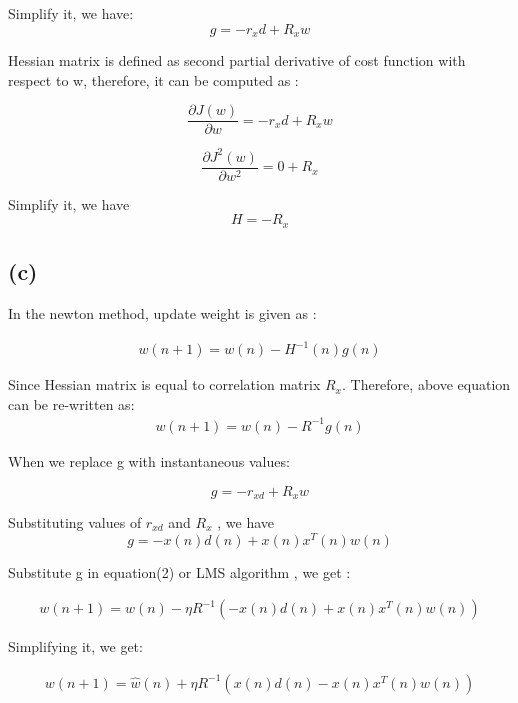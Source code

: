 \documentclass[12pt]{article}
\begin{document}
Simplify it, we have: $$ g = -r_xd + R_xw $$ 

Hessian matrix is defined as second partial derivative of cost function with respect to w, therefore, it can be computed as :

	$$ \frac{\partial J(w)}{\partial w} = -r_xd + R_xw  $$

		$$ \frac{\partial J^2(w)}{\partial w^2} = 0 + R_x $$
		
Simplify it, we have $$H = -R_x $$

\subsection{(c)}

In the newton method, update weight is given as : 

\begin{align}
 w(n+1) = w(n) - H^{-1}(n)g(n)
\end{align}


Since Hessian matrix is equal to correlation matrix $R_x$. Therefore, above equation can be re-written as: 
\begin{align}
w(n+1) = w(n) - R^{-1}g(n)
\end{align}

When we replace g with instantaneous values: 

$$ g = -r_{xd} + R_{x}w $$ 

Substituting values of $r_{xd} $ and $R_{x}$ , we have $$ g  = - x(n)d(n) + x(n)x^{T} (n)w(n) $$

Substitute g in equation(2) or LMS algorithm , we get : 

\begin{align}
w(n+1 ) = \hat{w}(n) − \eta R^{-1} (- x(n)d(n) + x(n)x^{T} (n)w(n))
\end{align}

Simplifying it, we get:

\begin{align}
w(n+1 ) = \hat{w}(n) + \eta R^{-1} ( x(n)d(n) - x(n)x^{T} (n)w(n))
\end{align}
\end{document}
